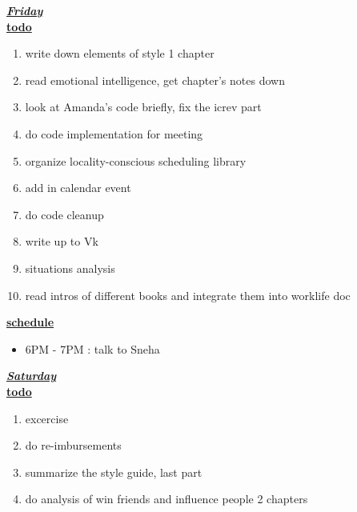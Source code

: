 \underline{\textbf{\textit{Friday}}}\\
\underline{\textbf{todo}}\\
\begin{enumerate}

\item write down elements of style 1 chapter 
\item read emotional intelligence, get chapter's notes down 

\item look at Amanda's code briefly, fix the icrev part    
\item do code implementation for meeting 
\item organize locality-conscious scheduling library 
\item add in calendar event 
\item do code cleanup 
\item write up to Vk 
\item situations analysis 

\item read intros of different books and integrate them into worklife doc

\end{enumerate}

\underline{\textbf{schedule}}\\
\begin{itemize}
\item 6PM - 7PM : talk to Sneha
\end{itemize}

\underline{\textbf{\textit{Saturday}}}\\
\underline{\textbf{todo}}\\
\begin{enumerate}
\item excercise
\item do re-imbursements
\item summarize the style guide, last part 
\item do analysis of win friends and influence people 2 chapters 
\end{enumerate}

